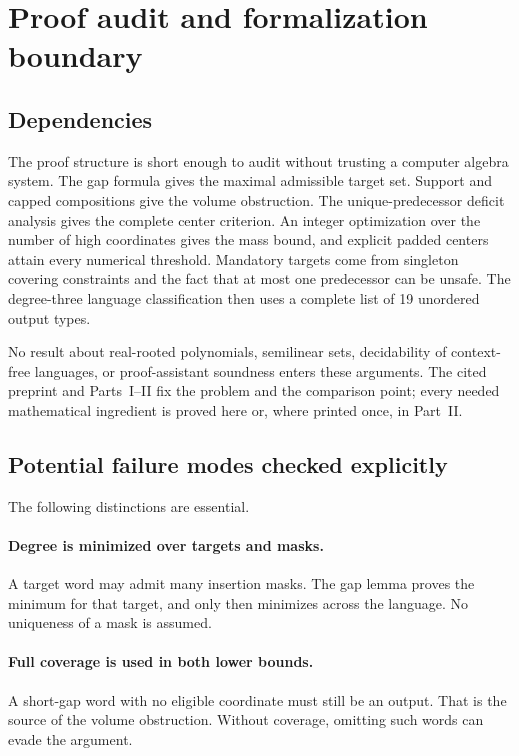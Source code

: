 \documentclass[11pt,letterpaper]{article}
\theoremstyle{definition}\newtheorem{definition}[theorem]{Definition}
\theoremstyle{remark}\newtheorem{remark}[theorem]{Remark}
\theoremstyle{definition}\newtheorem{question}[theorem]{Question}
\begin{document}
\section{Proof audit and formalization boundary}\label{ids:si:sec:audit}

\subsection{Dependencies}
The proof structure is short enough to audit without trusting a computer
algebra system. The gap formula gives the maximal admissible target set.
Support and capped compositions give the volume obstruction. The
unique-predecessor deficit analysis gives the complete center criterion.
An integer optimization over the number of high coordinates gives the
mass bound, and explicit padded centers attain every numerical threshold.
Mandatory targets come from singleton covering constraints and the fact
that at most one predecessor can be unsafe. The degree-three language
classification then uses a complete list of 19 unordered output types.

No result about real-rooted polynomials, semilinear sets, decidability of
context-free languages, or proof-assistant soundness enters these arguments.
The cited preprint and Parts~I--II fix the problem and the comparison point;
every needed mathematical ingredient is proved here or, where printed once, in
Part~II.

\subsection{Potential failure modes checked explicitly}
The following distinctions are essential.

\paragraph{Degree is minimized over targets and masks.}
A target word may admit many insertion masks. The gap lemma proves the
minimum for that target, and only then minimizes across the language.
No uniqueness of a mask is assumed.

\paragraph{Full coverage is used in both lower bounds.}
A short-gap word with no eligible coordinate must still be an output. That
is the source of the volume obstruction. Without coverage, omitting such
words can evade the argument.
\end{document}
